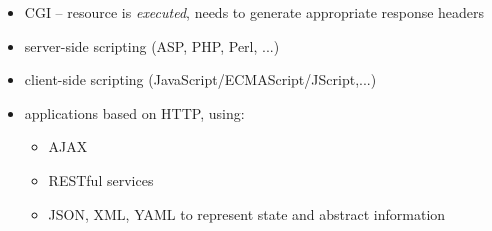 \documentclass[xga]{xdvislides}
\begin{document}
\begin{itemize}
	\item CGI -- resource is {\em executed}, needs to generate
		appropriate response headers
	\item server-side scripting (ASP, PHP, Perl, ...)
	\item client-side scripting (JavaScript/ECMAScript/JScript,...)
	\item applications based on HTTP, using:
		\begin{itemize}
			\item AJAX
			\item RESTful services
			\item JSON, XML, YAML to represent state and
				abstract information
		\end{itemize}
\end{itemize}

%
%
\end{document}
